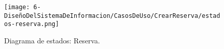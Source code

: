 \begin{figure}[H]
	\centering
	\texttt{[image: 6-DiseñoDelSistemaDeInformacion/CasosDeUso/CrearReserva/estados-reserva.png]}
	\caption{Diagrama de estados: Reserva.}
\end{figure}